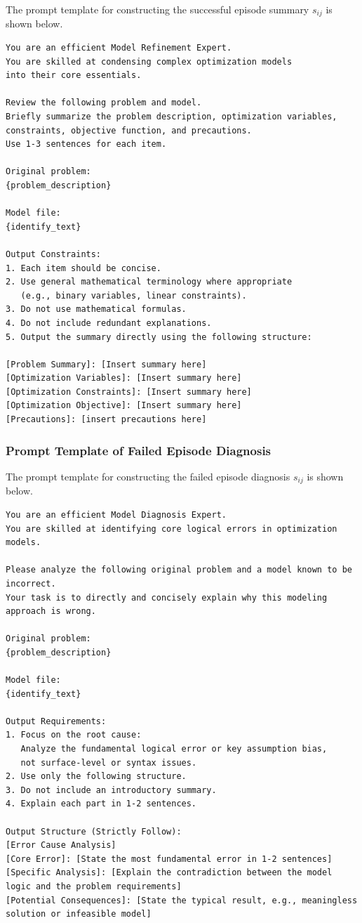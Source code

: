 The prompt template for constructing the successful episode summary \(s_{ij}\)
is shown below.
\begin{lstlisting}[style=promptstyle]
You are an efficient Model Refinement Expert.
You are skilled at condensing complex optimization models
into their core essentials.

Review the following problem and model.
Briefly summarize the problem description, optimization variables,
constraints, objective function, and precautions.
Use 1-3 sentences for each item.

Original problem:
{problem_description}

Model file:
{identify_text}

Output Constraints:
1. Each item should be concise.
2. Use general mathematical terminology where appropriate
   (e.g., binary variables, linear constraints).
3. Do not use mathematical formulas.
4. Do not include redundant explanations.
5. Output the summary directly using the following structure:

[Problem Summary]: [Insert summary here]
[Optimization Variables]: [Insert summary here]
[Optimization Constraints]: [Insert summary here]
[Optimization Objective]: [Insert summary here]
[Precautions]: [insert precautions here]
\end{lstlisting}

\subsubsection{Prompt Template of Failed Episode Diagnosis}
\label{app:prompt_failure_diagnosis}

The prompt template for constructing the failed episode diagnosis \(s_{ij}\)
is shown below.
\begin{lstlisting}[style=promptstyle]
You are an efficient Model Diagnosis Expert.
You are skilled at identifying core logical errors in optimization models.

Please analyze the following original problem and a model known to be incorrect.
Your task is to directly and concisely explain why this modeling approach is wrong.

Original problem:
{problem_description}

Model file:
{identify_text}

Output Requirements:
1. Focus on the root cause:
   Analyze the fundamental logical error or key assumption bias,
   not surface-level or syntax issues.
2. Use only the following structure.
3. Do not include an introductory summary.
4. Explain each part in 1-2 sentences.

Output Structure (Strictly Follow):
[Error Cause Analysis]
[Core Error]: [State the most fundamental error in 1-2 sentences]
[Specific Analysis]: [Explain the contradiction between the model logic and the problem requirements]
[Potential Consequences]: [State the typical result, e.g., meaningless solution or infeasible model]
\end{lstlisting}

